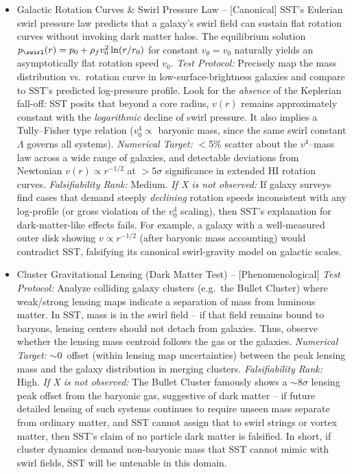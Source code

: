 \documentclass[11pt]{article}
\begin{document}
\begin{itemize}

\item
Galactic Rotation Curves \& Swirl Pressure Law -- [Canonical] SST's Eulerian swirl pressure law predicts that a galaxy's swirl field can sustain flat rotation curves without invoking dark matter halos. The equilibrium solution $p_{\swirl}(r) = p_0 + \rho_f v_0^2 \ln(r/r_0)$ for constant $v_\theta=v_0$ naturally yields an asymptotically flat rotation speed $v_0$. \textit{Test Protocol:} Precisely map the mass distribution vs.\ rotation curve in low-surface-brightness galaxies and compare to SST's predicted log-pressure profile. Look for the \textit{absence} of the Keplerian fall-off: SST posits that beyond a core radius, $v(r)$ remains approximately constant with the \textit{logarithmic} decline of swirl pressure. It also implies a Tully--Fisher type relation ($v_0^4 \propto$ baryonic mass, since the same swirl constant $\Lambda$ governs all systems). \textit{Numerical Target:} $<$5\% scatter about the $v^4$--mass law across a wide range of galaxies, and detectable deviations from Newtonian $v(r)\propto r^{-1/2}$ at $>5\sigma$ significance in extended HI rotation curves. \textit{Falsifiability Rank:} Medium. \textit{If X is not observed:} If galaxy surveys find cases that demand steeply \textit{declining} rotation speeds inconsistent with any log-profile (or gross violation of the $v_0^4$ scaling), then SST's explanation for dark-matter-like effects fails. For example, a galaxy with a well-measured outer disk showing $v \propto r^{-1/2}$ (after baryonic mass accounting) would contradict SST, falsifying its canonical swirl-gravity model on galactic scales.

\item
Cluster Gravitational Lensing (Dark Matter Test) -- [Phenomenological] \textit{Test Protocol:} Analyze colliding galaxy clusters (e.g.\ the Bullet Cluster) where weak/strong lensing maps indicate a separation of mass from luminous matter. In SST, mass is in the swirl field -- if that field remains bound to baryons, lensing centers should not detach from galaxies. Thus, observe whether the lensing mass centroid follows the gas or the galaxies. \textit{Numerical Target:} $\sim$0\arcsec\ offset (within lensing map uncertainties) between the peak lensing mass and the galaxy distribution in merging clusters. \textit{Falsifiability Rank:} High. \textit{If X is not observed:} The Bullet Cluster famously shows a $\sim8\sigma$ lensing peak offset from the baryonic gas, suggestive of dark matter -- if future detailed lensing of such systems continues to require unseen mass separate from ordinary matter, and SST cannot assign that to swirl strings or vortex matter, then SST's claim of no particle dark matter is falsified. In short, if cluster dynamics demand non-baryonic mass that SST cannot mimic with swirl fields, SST will be untenable in this domain.


\end{itemize}
\end{document}

